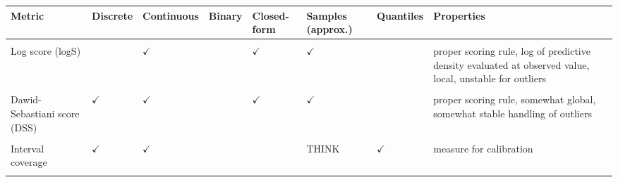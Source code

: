 \documentclass[article,shortnames]{jss}\usepackage[]{graphicx}\usepackage[]{color}
\begin{document}
\newpage
\begin{table}[h!]
\centering
\begingroup\fontsize{8}{10}\selectfont

\begin{longtable}[t]{>{\raggedright\arraybackslash}p{1.8 cm}>{\centering\arraybackslash}p{1.2cm}>{\centering\arraybackslash}p{1.2cm}>{\centering\arraybackslash}p{1.0cm}>{\centering\arraybackslash}p{1.0cm}>{\centering\arraybackslash}p{1.3cm}>{\centering\arraybackslash}p{1.1cm}>{\raggedright\arraybackslash}p{3.4cm}}
\toprule
Metric & Discrete & Continuous & Binary & Closed-form & Samples (approx.) & Quantiles & Properties\\
\midrule
\cellcolor{gray!6}{(Continuous) ranked probability score (CRPS)} & \cellcolor{gray!6}{$\checkmark$} & \cellcolor{gray!6}{$\checkmark$} & \cellcolor{gray!6}{} & \cellcolor{gray!6}{$\checkmark$} & \cellcolor{gray!6}{$\checkmark$} & \cellcolor{gray!6}{} & \cellcolor{gray!6}{proper scoring rule, global, stable handling of outliers}\\
\addlinespace
Log score (logS) &  & $\checkmark$ &  & $\checkmark$ & $\checkmark$ &  & proper scoring rule, log of predictive density evaluated at observed value, local, unstable for outliers\\
\addlinespace
\cellcolor{gray!6}{(Weighted) interval score (WIS)} & \cellcolor{gray!6}{$\checkmark$} & \cellcolor{gray!6}{$\checkmark$} & \cellcolor{gray!6}{} & \cellcolor{gray!6}{} & \cellcolor{gray!6}{THINK} & \cellcolor{gray!6}{$\checkmark$} & \cellcolor{gray!6}{proper scoring rule, global, stable handling of outliers, converges to crps for an increasing numbre of equally spaced intervals}\\
\addlinespace
Dawid-Sebastiani score (DSS) & $\checkmark$ & $\checkmark$ &  & $\checkmark$ & $\checkmark$ &  & proper scoring rule, somewhat global, somewhat stable handling of outliers\\
\addlinespace
\cellcolor{gray!6}{Brier score (BS)} & \cellcolor{gray!6}{} & \cellcolor{gray!6}{} & \cellcolor{gray!6}{$\checkmark$} & \cellcolor{gray!6}{} & \cellcolor{gray!6}{$\checkmark$} & \cellcolor{gray!6}{} & \cellcolor{gray!6}{proper scoring rule}\\
\addlinespace
Interval coverage & $\checkmark$ & $\checkmark$ &  &  & THINK & $\checkmark$ & measure for calibration\\
\addlinespace
\cellcolor{gray!6}{Quantile coverage} & \cellcolor{gray!6}{$\checkmark$} & \cellcolor{gray!6}{$\checkmark$} & \cellcolor{gray!6}{} & \cellcolor{gray!6}{} & \cellcolor{gray!6}{THINK} & \cellcolor{gray!6}{$\checkmark$} & \cellcolor{gray!6}{measure for calibration}\\

\end{longtable}
\end{table}
\end{document}
